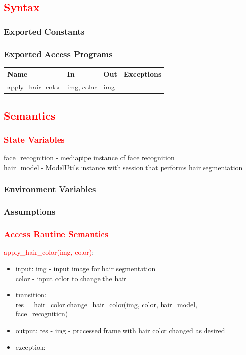 \documentclass[12pt, titlepage]{article}
\begin{document}
\subsection{\textcolor{red}{Syntax}}

\subsubsection{Exported Constants}
\subsubsection{Exported Access Programs}

\begin{center}
\begin{tabular}{p{4cm} p{3cm} p{4cm} p{4cm}}
\hline
\textbf{Name} & \textbf{In} & \textbf{Out} & \textbf{Exceptions} \\
\hline
apply\_hair\_color & img, color & img & \\
\hline
\end{tabular}
\end{center}

\subsection{\textcolor{red}{Semantics}}

\subsubsection{\textcolor{red}{State Variables}}
face\_recognition - mediapipe instance of face recognition \\
hair\_model - ModelUtils instance with session that performs hair segmentation

\subsubsection{Environment Variables}

\subsubsection{Assumptions}

\subsubsection{\textcolor{red}{Access Routine Semantics}}

\noindent
\textcolor{red}{apply\_hair\_color(img, color)}: 
\begin{itemize}
\item input: img - input image for hair segmentation \\ 
color - input color to change the hair 
\item transition: \\
res = hair\_color.change\_hair\_color(img, color, hair\_model, face\_recognition)
\item output:
res - img - processed frame with hair color changed as desired
\item exception:
\end{itemize}
\end{document}
